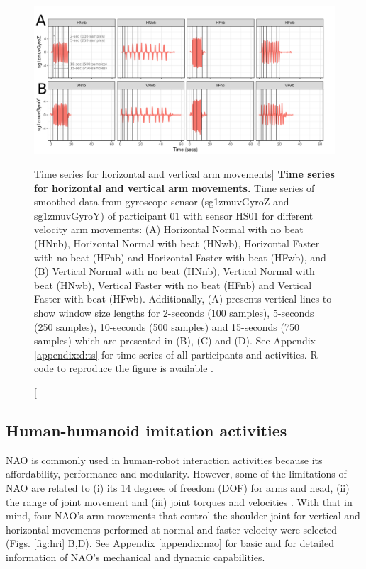 \begin{figure}
  \centering
  \includegraphics[width=1.0\textwidth]{fig_4_02}
    \caption
	[Time series for horizontal and vertical arm movements]{
	{\bf Time series for horizontal and vertical arm movements.} 
		Time series of smoothed data from gyroscope sensor 
		(sg1zmuvGyroZ and sg1zmuvGyroY) of participant 01 
		with sensor HS01 for different velocity arm movements: 
		(A) Horizontal Normal with no beat (HNnb),
			Horizontal Normal with beat (HNwb), 
			Horizontal Faster with no beat (HFnb) and
			Horizontal Faster with beat (HFwb), and 
		(B) Vertical Normal with no beat (HNnb),
			Vertical Normal with beat (HNwb), 
			Vertical Faster with no beat (HFnb) and
			Vertical Faster with beat (HFwb).
		Additionally, (A) presents vertical lines 
		to show window size lengths for 2-seconds 
		(100 samples), 5-seconds (250 samples), 
		10-seconds (500 samples) and 15-seconds (750 samples)
		which are presented in (B), (C) and (D).
	See Appendix \ref{appendix:d:ts} for 
	time series of all participants and activities. 
		R code to reproduce the figure is available \cite{xochicale2018}.
        }
	\label{fig:hii-sts}
\end{figure}

\subsection{Human-humanoid imitation activities} \label{sec:experiment:hhi}
NAO is commonly used in human-robot interaction activities because 
its affordability, performance and modularity.
However, some of the limitations of NAO are related to 
(i) its 14 degrees of freedom (DOF) for arms and head,
(ii) the range of joint movement and 
(iii) joint torques and velocities \citep{gouaillier2009}. 
With that in mind, four NAO's arm movements 
that control the shoulder joint for vertical and horizontal
movements performed at normal and faster velocity 
were selected (Figs. \ref{fig:hri} B,D).
See Appendix \ref{appendix:nao} for basic and \cite{gouaillier2009}
for detailed information of NAO's mechanical and dynamic capabilities. 

